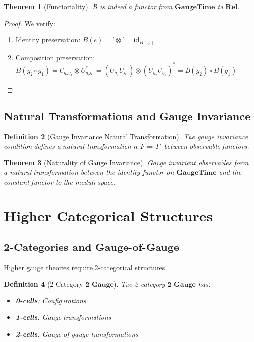 \documentclass[12pt,a4paper]{article}
\newtheorem{theorem}{Theorem}[section]
\newtheorem{definition}[theorem]{Definition}
\newcommand{\id}{\mathrm{id}}
\newcommand{\comp}{\circ}
\begin{document}
\begin{theorem}[Functoriality]
$B$ is indeed a functor from $\mathbf{GaugeTime}$ to $\mathbf{Rel}$.
\end{theorem}

\begin{proof}
We verify:
\begin{enumerate}
\item Identity preservation: $B(e) = \mathbb{I} \otimes \mathbb{I} = \id_{B(\phi)}$
\item Composition preservation: $B(g_2 \comp g_1) = U_{g_2g_1} \otimes U_{g_2g_1}^* = (U_{g_2}U_{g_1}) \otimes (U_{g_2}U_{g_1})^* = B(g_2) \comp B(g_1)$
\end{enumerate}
\end{proof}

\subsection{Natural Transformations and Gauge Invariance}

\begin{definition}[Gauge Invariance Natural Transformation]
The gauge invariance condition defines a natural transformation $\eta: F \Rightarrow F'$ between observable functors.
\end{definition}

\begin{theorem}[Naturality of Gauge Invariance]
Gauge invariant observables form a natural transformation between the identity functor on $\mathbf{GaugeTime}$ and the constant functor to the moduli space.
\end{theorem}

\section{Higher Categorical Structures}

\subsection{2-Categories and Gauge-of-Gauge}

Higher gauge theories require 2-categorical structures.

\begin{definition}[2-Category $\mathbf{2\text{-}Gauge}$]
The 2-category $\mathbf{2\text{-}Gauge}$ has:
\begin{itemize}
\item \textbf{0-cells}: Configurations
\item \textbf{1-cells}: Gauge transformations
\item \textbf{2-cells}: Gauge-of-gauge transformations
\end{itemize}
\end{definition}
\end{document}
